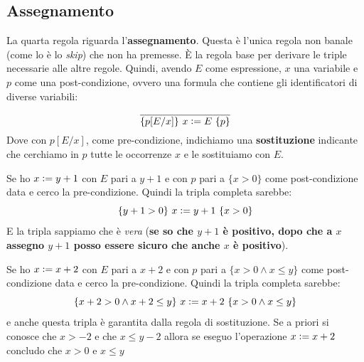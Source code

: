 \subsection{Assegnamento}
\begin{definizione}
	La quarta regola riguarda l'\textbf{assegnamento}. Questa è l'unica regola
	non banale (come lo è lo \textit{skip}) che non ha premesse. È la regola base
	per derivare le triple necessarie alle altre regole. Quindi, avendo $E$ come
	espressione, $x$ una variabile e $p$ come una post-condizione, ovvero una
	formula che contiene gli identificatori di diverse variabili:
	\begin{align}\label{AssignmentRule}
		\frac{}{\{p[E/x]\}\,\, x\cceq E\,\,\{p\}} 
	\end{align}
	Dove con $p[E/x]$, come pre-condizione, indichiamo una \textbf{sostituzione} 
	indicante che cerchiamo in $p$ tutte le occorrenze $x$ e le sostituiamo con $E$.
	\begin{esempio}
		Se ho $x \cceq y+1$ con $E$ pari a $y+1$ e con $p$ pari a $\{x>0\}$ come
		post-condizione data e cerco la pre-condizione. Quindi la tripla completa
		sarebbe: 
		\[\{y+1>0\}\,\, x \cceq y+1\,\,\{x>0\}\]
		E la tripla sappiamo che è \emph{vera} (\textbf{se so che $y+1$ è positivo, dopo
		che a $x$ assegno $y+1$ posso essere sicuro che anche $x$ è positivo}).
	\end{esempio}
	\begin{esempio}
		Se ho $x \cceq x+2$ con $E$ pari a $x+2$ e con $p$ pari a $\{x>0\land x\leq
		y\}$ come post-condizione data e cerco la pre-condizione. Quindi la tripla
		completa sarebbe:
		\[\{x+2>0\land x+2\leq y\}\,\, x \cceq x+2\,\,\{x>0\land x\leq y\}\]
		e anche questa tripla è garantita dalla regola di sostituzione.
		Se a priori si conosce che $x>-2$ e che $x \leq y-2$ allora se eseguo l'operazione $x \cceq x+2$ concludo che $x>0$ e $x \leq y$
	\end{esempio}
\end{definizione}
